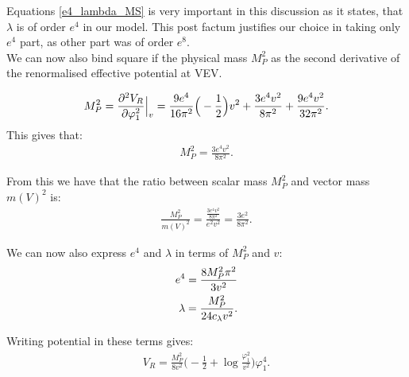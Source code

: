 Equations \ref{e4_lambda_MS} is very important in this discussion as it states, that $\lambda$ 
is of order $e^4$ in our model. This post factum justifies our 
choice in taking only $e^4$ part, as other part was of order $e^8$. \\

We can now also bind square if the physical mass $M_P^2$ as the second derivative of the 
renormalised effective potential at VEV.

\begin{align}
M_P^2 = \frac{\partial^2 V_R}{\partial \varphi_1^2} \Big|_v = \frac{9e^4}{16\pi^2}\Big(-\frac{1}{2}\Big)v^2+\frac{3e^4v^2}{8\pi^2} 
+\frac{9e^4v^2}{32\pi^2}.
\end{align}
This gives that:
\begin{align}
M_P^2 = \frac{3e^4v^2}{8\pi^2}.
\end{align}

From this we have that the ratio between scalar mass $M_P^2$ and vector mass $m(V)^2$ is:
\begin{align}
\frac{M_P^2}{m(V)^2} = \frac{\frac{3e^4v^2}{8\pi^2}}{e^2v^2} = \frac{3e^2}{8\pi^2}.
\end{align}

We can now also express $e^4$ and $\lambda$ in terms of $M_P^2$ and $v$:
\begin{align}
e^4 = \frac{8M_P^2\pi^2}{3v^2} \\
\lambda = \frac{M_P^2}{24c_\lambda v^2}.
\end{align}

Writing potential in these terms gives:
\begin{align}
V_R = \frac{M_P^2}{8v^2}\Big(-\frac{1}{2}+\log\frac{\varphi_1^2}{v^2}\Big)\varphi_1^4.
\end{align}



